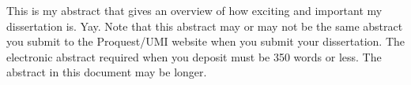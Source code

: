 This is my abstract that gives an overview of how exciting and important my dissertation is. Yay.
Note that this abstract may or may not be the same abstract you submit to the Proquest/UMI website when you submit your dissertation. The electronic abstract required when you deposit must be 350 words or less.  The abstract in this document may be longer.